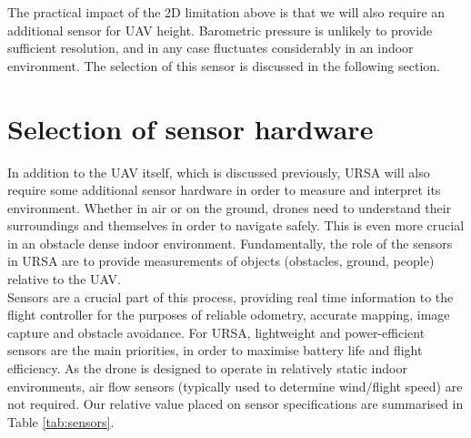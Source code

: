 \documentclass[capstone_report.tex]{subfiles}
\begin{document}
	The practical impact of the 2D limitation above is that we will also require an additional sensor for UAV height. Barometric pressure is unlikely to provide sufficient resolution, and in any case fluctuates considerably in an indoor environment. The selection of this sensor is discussed in the following section. \\

\section{Selection of sensor hardware}
In addition to the UAV itself, which is discussed previously, URSA will also require some additional sensor hardware in order to measure and interpret its environment. Whether in air or on the ground, drones need to understand their surroundings and themselves in order to navigate safely. This is even more crucial in an obstacle dense indoor environment. Fundamentally, the role of the sensors in URSA are to provide measurements of objects (obstacles, ground, people) relative to the UAV.\\

Sensors are a crucial part of this process, providing real time information to the flight controller for the purposes of reliable odometry, accurate mapping, image capture and obstacle avoidance. For URSA, lightweight and power-efficient sensors are the main priorities, in order to maximise battery life and flight efficiency. As the drone is designed to operate in relatively static indoor environments, air flow sensors (typically used to determine wind/flight speed) are not required. Our relative value placed on sensor specifications are summarised in Table \ref{tab:sensors}.
\end{document}
